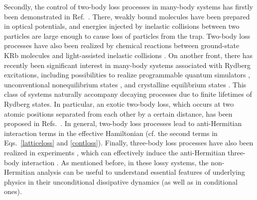 \documentclass{tADP2e}
\theoremstyle{plain}
\theoremstyle{plain}
\theoremstyle{definition}
\begin{document}
 Secondly,  the control of two-body loss processes in many-body systems has firstly been demonstrated in Ref.~\cite{NS08}. There, weakly bound molecules have been prepared in optical potentials, and energies injected by inelastic collisions between two particles are large enough to cause loss of particles from the trap. Two-body loss processes have also been realized by chemical reactions between ground-state KRb molecules \cite{YB13} and light-assisted inelastic collisions \cite{TT17}. 
 On another front, there has recently been significant interest in many-body systems associated with Rydberg excitations, including possibilities to realize programmable quantum simulators \cite{Barredo1021,Endres1024}, unconventional nonequilibrium states \cite{LTE12,BH17,YA19L}, and crystalline equilibrium states \cite{SP12}. This class of systems naturally accompany decaying processes due to finite lifetimes of Rydberg states. In particular, an exotic two-body loss, which occurs at two atomic positions separated from each other by a certain distance, has been proposed in Refs.~\cite{AC12,EB14}. In general, two-body loss processes lead to anti-Hermitian interaction terms in the effective Hamiltonian \cite{NS08,JJGR09,YB13,ZB14,TT17} (cf. the second terms in Eqs.~\eqref{latticeloss} and \eqref{contloss}).  Finally, three-body loss processes have also been realized in experiments  \cite{KT06,EU15}, which can effectively induce the anti-Hermitian three-body interaction \cite{PB07,RA07,DAJ09,DS10,CYC11}. As mentioned before, in these lossy systems, the non-Hermitian analysis can be useful to understand essential features of underlying physics in their unconditional dissipative dynamics (as well as in conditional ones). 
\end{document}

